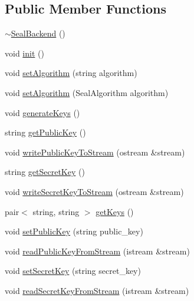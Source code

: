 \subsection*{Public Member Functions}
\begin{DoxyCompactItemize}
\item 
\hyperlink{classhomomorphine_1_1_seal_backend_a7224092a19a3472a5143d16b80fb9775}{$\sim$\+Seal\+Backend} ()
\item 
void \hyperlink{classhomomorphine_1_1_seal_backend_a106556100ae5f2e9dadfa9fc64603d94}{init} ()
\item 
void \hyperlink{classhomomorphine_1_1_seal_backend_a46a336bca80c5450a1f3ea1125d0d0e8}{set\+Algorithm} (string algorithm)
\item 
void \hyperlink{classhomomorphine_1_1_seal_backend_aaf2100eb13b4434bc0136ff00578bb8d}{set\+Algorithm} (Seal\+Algorithm algorithm)
\item 
void \hyperlink{classhomomorphine_1_1_seal_backend_a1e2ed46b896d4a5b5d930ec7bcd3207b}{generate\+Keys} ()
\item 
string \hyperlink{classhomomorphine_1_1_seal_backend_aa2dce269303eaa73c62dbfacce66dc1a}{get\+Public\+Key} ()
\item 
void \hyperlink{classhomomorphine_1_1_seal_backend_af09735f0304cc28e6dc967938a4ad277}{write\+Public\+Key\+To\+Stream} (ostream \&stream)
\item 
string \hyperlink{classhomomorphine_1_1_seal_backend_a8ad57a68eb8a02d162ba439046565471}{get\+Secret\+Key} ()
\item 
void \hyperlink{classhomomorphine_1_1_seal_backend_ab3420695131ae4c2a3891917480ddacf}{write\+Secret\+Key\+To\+Stream} (ostream \&stream)
\item 
pair$<$ string, string $>$ \hyperlink{classhomomorphine_1_1_seal_backend_a30358e6405e2d1470468cf55aefb3f4d}{get\+Keys} ()
\item 
void \hyperlink{classhomomorphine_1_1_seal_backend_a6d34008acb06ff1d6743f9163fcd41fb}{set\+Public\+Key} (string public\+\_\+key)
\item 
void \hyperlink{classhomomorphine_1_1_seal_backend_a5bcb7f49667f2a2e095690fdec484b51}{read\+Public\+Key\+From\+Stream} (istream \&stream)
\item 
void \hyperlink{classhomomorphine_1_1_seal_backend_aa9fd3331b2c710e8fdfc3385bbf11eb5}{set\+Secret\+Key} (string secret\+\_\+key)
\item 
void \hyperlink{classhomomorphine_1_1_seal_backend_a5c1607bb712ff2776f4d4ca0c75b3e37}{read\+Secret\+Key\+From\+Stream} (istream \&stream)

\end{DoxyCompactItemize}
